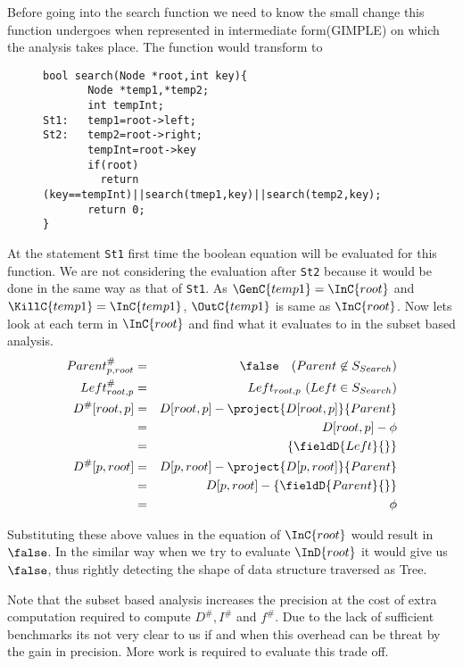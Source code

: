\begin{example}
\par
Before going into the search function we need to know the small change this function undergoes when represented in intermediate form(GIMPLE) on which the
analysis takes place. The function would transform to

\begin{figure}[h]
\begin{lstlisting}
bool search(Node *root,int key){
       Node *temp1,*temp2;
       int tempInt;
St1:   temp1=root->left;
St2:   temp2=root->right;
       tempInt=root->key
       if(root)
         return (key==tempInt)||search(tmep1,key)||search(temp2,key);
       return 0;
}
\end{lstlisting}
\end{figure}

At the statement {\tt St1} first time the boolean equation will be evaluated for this function. We are not considering the evaluation after {\tt St2} because it would be done in the same way as that of {\tt St1}. 
As $\GenC{temp1} = \InC{root}$ and $\KillC{temp1} = \InC{temp1}$,  
$\OutC{temp1}$ is same as $\InC{root}$. Now lets look at each term in $\InC{root}$ and find what it evaluates to in the subset based analysis. 
\begin{eqnarray*}
 Parent_{p,root}^{\#} &=& \false  \ \ \ (Parent \not \in S_{Search} ) \\
 Left_{root,p}^{\#} &=& Left_{root,p} \  (Left \in S_{Search} ) \\
 D^{\#}[root,p] &=& D[root,p] - \project{D[root,p]}{Parent} \\
		&=& D[root,p] - \phi \\
		&=& \{\fieldD{Left}{}\} \\
 D^{\#}[p,root] &=& D[p,root] - \project{D[p,root]}{Parent} \\
		&=& D[p,root] - \{\fieldD{Parent}{}\} \\
		&=& \phi
\end{eqnarray*}

Substituting these above values in the equation of $\InC{root}$ would result in $\false$. In the similar way when we try to evaluate $\InD{root}$ it would give us $\false$, thus rightly detecting the shape of data structure traversed
as Tree.
\end{example}

\par
Note that the subset based analysis increases the precision at the cost of extra computation required to compute $D^{\#} ,I^{\#}$ and $f^{\#}$.
Due to the lack of sufficient benchmarks its not very clear to us if and when this overhead can be threat by the gain in precision. More work is required to evaluate this trade off.


